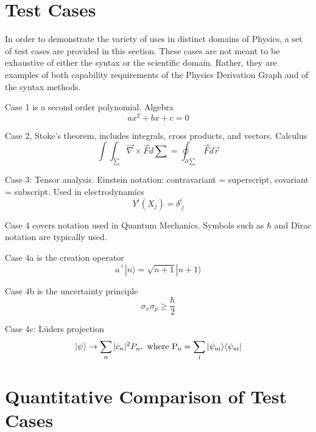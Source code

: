\documentclass{article}
\begin{document}
\begin{multicols}{2}
\section{Test Cases\label{sec:test_cases}}
In order to demonstrate the variety of uses in distinct domains of Physics, a set of test cases are provided in this section. These cases are not meant to be exhaustive of either the syntax or the scientific domain. Rather, they are examples of both capability requirements of the Physics Derivation Graph and of the syntax methods. 


Case 1 is a second order polynomial. Algebra
\begin{equation}
a x^2 + b x + c = 0
\label{eq:polynomial_case1_body}
\end{equation}

Case 2, Stoke's theorem, includes integrals, cross products, and vectors. Calculus
\begin{equation}
\int \int_{\sum} \vec{\nabla} \times \vec{F} \dot d\sum = \oint_{\partial \sum} \vec{F}\dot d\vec{r}
\label{eq:stokes_case2_body}
\end{equation}

Case 3: Tensor analysis. Einstein notation: contravariant = superscript, covariant = subscript. Used in electrodynamics
\begin{equation}
Y^i(X_j) = \delta^i_{\ j}
\label{eq:tensor_analysis_case3_body}
\end{equation}

Case 4 covers notation used in Quantum Mechanics. Symbols such as $\hbar$ and Dirac notation are typically used.

Case 4a is the creation operator 
\begin{equation}
\hat{a}^+ |n\rangle = \sqrt{n+1} |n+1\rangle
\label{eq:creation_operator_case4a_body}
\end{equation}

Case 4b is the uncertainty principle
\begin{equation}
\sigma_x \sigma_p \geq \frac{\hbar}{2}
\label{eq:uncertainty_principle_case4b_body}
\end{equation}

Case 4c: L\"{u}ders projection
\begin{equation}
 |\psi\rangle \rightarrow \sum_n  |c_n|^2 P_n,\ \rm{where}\ P_n = \sum_i |\psi_{ni}\rangle \langle \psi_{ni}|
\label{eq:Luders_projection_case4c_body}
\end{equation}

\section{Quantitative Comparison of Test Cases\label{sec:quant_compare}}

\end{multicols}
\end{document}
